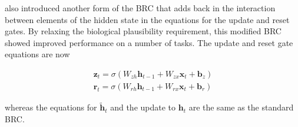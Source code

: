 \cite{vecoven2021brc} also introduced another form of the BRC that adds back in the interaction between elements of the hidden state in the equations for the update and reset gates. By relaxing the biological plausibility requirement, this modified BRC showed improved performance on a number of tasks. The update and reset gate equations are now

\begin{gather*}
	\mathbf{z}_t = \sigma(W_{zh} \mathbf{h}_{t-1} + W_{zx} \mathbf{x}_t + \mathbf{b}_z)\\
	\mathbf{r}_t = \sigma(W_{rh} \mathbf{h}_{t-1} + W_{rx} \mathbf{x}_t + \mathbf{b}_r)
\end{gather*}

whereas the equations for \(\mathbf{\tilde{h}}_t\) and the update to \(\mathbf{h}_t\) are the same as the standard BRC.